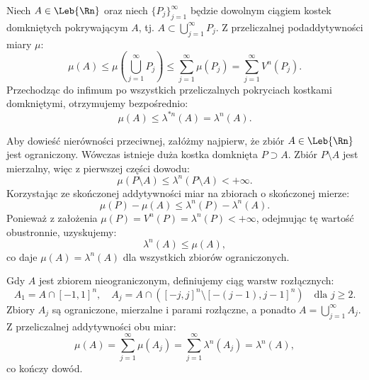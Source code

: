 \begin{dow}
    Niech $A \in \Leb{\Rn}$ oraz niech $\{P_j\}_{j=1}^\infty$ będzie dowolnym ciągiem kostek domkniętych pokrywającym $A$, tj. $A \subset \bigcup_{j=1}^\infty P_j$. Z przeliczalnej podaddytywności miary $\mu$:
    \begin{equation*}
        \mu(A) \le \mu\left(\bigcup_{j=1}^\infty P_j\right) \le \sum_{j=1}^\infty \mu(P_j) = \sum_{j=1}^\infty V^n(P_j).
    \end{equation*}
    Przechodząc do infimum po wszystkich przeliczalnych pokryciach kostkami domkniętymi, otrzymujemy bezpośrednio:
    \begin{equation*}
        \mu(A) \le \lambda^{*n}(A) = \lambda^n(A).
    \end{equation*}

    Aby dowieść nierówności przeciwnej, załóżmy najpierw, że zbiór $A \in \Leb{\Rn}$ jest ograniczony. Wówczas istnieje duża kostka domknięta $P \supset A$. Zbiór $P \setminus A$ jest mierzalny, więc z pierwszej części dowodu:
    \begin{equation*}
        \mu(P \setminus A) \le \lambda^n(P \setminus A) < +\infty.
    \end{equation*}
    Korzystając ze skończonej addytywności miar na zbiorach o skończonej mierze:
    \begin{equation*}
        \mu(P) - \mu(A) \le \lambda^n(P) - \lambda^n(A).
    \end{equation*}
    Ponieważ z założenia $\mu(P) = V^n(P) = \lambda^n(P) < +\infty$, odejmując tę wartość obustronnie, uzyskujemy:
    \begin{equation*}
        \lambda^n(A) \le \mu(A),
    \end{equation*}
    co daje $\mu(A) = \lambda^n(A)$ dla wszystkich zbiorów ograniczonych.

    Gdy $A$ jest zbiorem nieograniczonym, definiujemy ciąg warstw rozłącznych:
    \begin{equation*}
        A_1 = A \cap [-1, 1]^n, \quad A_j = A \cap \left( [-j, j]^n \setminus [-(j-1), j-1]^n \right) \quad \text{dla } j \ge 2.
    \end{equation*}
    Zbiory $A_j$ są ograniczone, mierzalne i parami rozłączne, a ponadto $A = \bigcup_{j=1}^\infty A_j$. Z przeliczalnej addytywności obu miar:
    \begin{equation*}
        \mu(A) = \sum_{j=1}^\infty \mu(A_j) = \sum_{j=1}^\infty \lambda^n(A_j) = \lambda^n(A),
    \end{equation*}
    co kończy dowód.
\end{dow}


